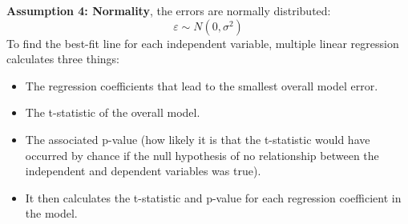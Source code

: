 \documentclass[a4paper]{article}
\theoremstyle{definition}
\begin{document}
\textbf{Assumption 4: Normality}, the errors are normally distributed:
\begin{equation*}
    \varepsilon \sim N(0, \sigma^2)
\end{equation*}
To find the best-fit line for each independent variable, multiple linear regression calculates three things:
\begin{itemize}
    \item The regression coefficients that lead to the smallest overall model error.
    \item The t-statistic of the overall model.
    \item The associated p-value (how likely it is that the t-statistic would have occurred by chance if the null hypothesis of no relationship between the independent and dependent variables was true).
    \item It then calculates the t-statistic and p-value for each regression coefficient in the model.
\end{itemize}
\end{document}
